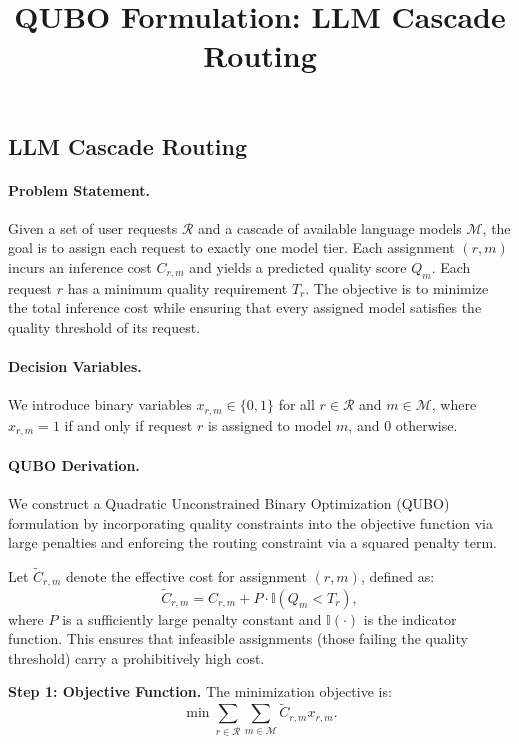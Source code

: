\documentclass[12pt]{article}
\title{QUBO Formulation: LLM Cascade Routing}
\date{}
\begin{document}
\maketitle

\subsection*{LLM Cascade Routing}

\paragraph{Problem Statement.}
Given a set of user requests $\mathcal{R}$ and a cascade of available language models $\mathcal{M}$, the goal is to assign each request to exactly one model tier. Each assignment $(r, m)$ incurs an inference cost $C_{r,m}$ and yields a predicted quality score $Q_m$. Each request $r$ has a minimum quality requirement $T_r$. The objective is to minimize the total inference cost while ensuring that every assigned model satisfies the quality threshold of its request.

\paragraph{Decision Variables.}
We introduce binary variables $x_{r,m} \in \{0,1\}$ for all $r \in \mathcal{R}$ and $m \in \mathcal{M}$, where $x_{r,m} = 1$ if and only if request $r$ is assigned to model $m$, and $0$ otherwise.

\paragraph{QUBO Derivation.}
We construct a Quadratic Unconstrained Binary Optimization (QUBO) formulation by incorporating quality constraints into the objective function via large penalties and enforcing the routing constraint via a squared penalty term.

Let $\tilde{C}_{r,m}$ denote the effective cost for assignment $(r,m)$, defined as:
\[
\tilde{C}_{r,m} = C_{r,m} + P \cdot \mathbb{I}(Q_m < T_r),
\]
where $P$ is a sufficiently large penalty constant and $\mathbb{I}(\cdot)$ is the indicator function. This ensures that infeasible assignments (those failing the quality threshold) carry a prohibitively high cost.

\textbf{Step 1: Objective Function.}
The minimization objective is:
\[
\min \sum_{r \in \mathcal{R}} \sum_{m \in \mathcal{M}} \tilde{C}_{r,m} x_{r,m}.
\]
\end{document}
